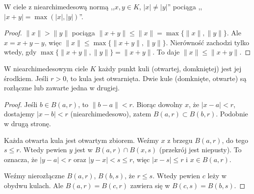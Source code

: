 \begin{fakt}
	W ciele z niearchimedesową normą ,,$x, y \in K$, $|x| \neq |y|$'' pociąga ,,$|x+y| = \max (|x|, |y|)$''.
\end{fakt}

\begin{proof}
	$\|x\| > \|y\|$ pociąga $\|x+y\| \le \|x\| = \max\{\|x\|,\|y\|\}$.
	Ale $x = x+y-y$, więc $\|x\| \le \max \{\|x+y\|, \|y\|\}$.
	Nierówność zachodzi tylko wtedy, gdy $\max\{\|x+y\|, \|y\|\} = \|x+y\|$.
	To daje $\|x\| \le \|x+y\|$.
\end{proof}

\begin{fakt}
	W niearchimedesowym ciele $K$ każdy punkt kuli (otwartej, domkniętej) jest jej środkiem.
	Jeśli $ r > 0$, to kula jest otwarnięta.
	Dwie kule (domknięte, otwarte) są rozłączne lub zawarte jedna w drugiej.
\end{fakt}

\begin{proof}
	Jeśli $b \in B(a, r)$, to $\|b-a\| < r$. Biorąc dowolny $x$, że $|x-a| < r$, dostajemy $|x-b| < r$ (niearchimedesowo), zatem $B(a,r) \subset B(b,r)$. Podobnie w drugą stronę.
	
	Każda otwarta kula jest otwartym zbiorem. Weźmy $x$ z brzegu $B(a,r)$, do tego $s \le r$. Wtedy pewien $y$ jest w $B(a,r) \cap B(x,s)$ (przekrój jest niepusty). To oznacza, że $|y-a| < r$ oraz $|y - x| < s \le r$, więc $|x-s| \le r$ i $x \in B(a,r)$.
	
	Weźmy nierozłączne $B(a,r)$, $B(b,s)$, że $r \le s$. Wtedy pewien $c$ leży w obydwu kulach. Ale $B(a,r) = B(c,r)$ zawiera się w $B(c,s) = B(b,s)$.
\end{proof}